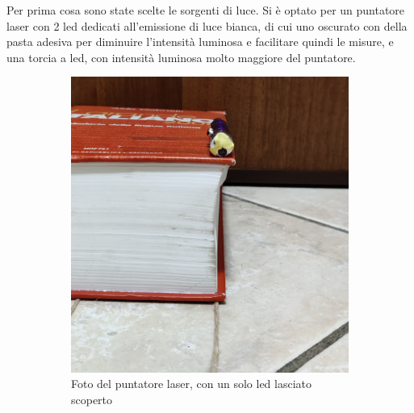\documentclass{article}
\begin{document}
Per prima cosa sono state scelte le sorgenti di luce. Si è optato per un puntatore laser con 2 led dedicati all'emissione di luce bianca, di cui uno oscurato con della pasta adesiva per diminuire l'intensità luminosa e facilitare quindi le misure, e una torcia a led, con intensità luminosa molto maggiore del puntatore. 

\begin{figure}[h!]
    \centering
    \begin{subfigure}[b]{0.4\linewidth}
        \includegraphics[width=\linewidth]{LedLungo0_Puntatore.jpg}
        \caption{Foto del puntatore laser, con un solo led lasciato scoperto}
    \end{subfigure}
    \begin{subfigure}[b]{0.32\linewidth}

\end{subfigure}
\end{figure}
\end{document}
